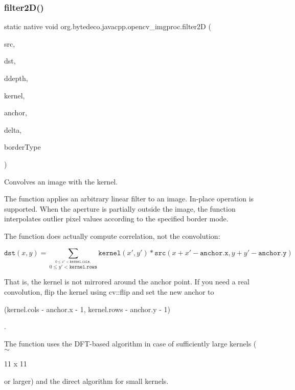 \subsubsection{\texorpdfstring{filter2\+D()}{filter2D()}}
{\footnotesize\ttfamily static native void org.\+bytedeco.\+javacpp.\+opencv\+\_\+imgproc.\+filter2D (\begin{DoxyParamCaption}\item[{@By\+Val Mat}]{src,  }\item[{@By\+Val Mat}]{dst,  }\item[{int}]{ddepth,  }\item[{@By\+Val Mat}]{kernel,  }\item[{@By\+Val(null\+Value=\char`\"{}cv\+::\+fr.antproject.utils.Point(-\/1,-\/1)\char`\"{}) fr.antproject.utils.Point}]{anchor,  }\item[{double}]{delta,  }\item[{int}]{border\+Type }\end{DoxyParamCaption})\hspace{0.3cm}{\ttfamily [static]}}



Convolves an image with the kernel. 

The function applies an arbitrary linear filter to an image. In-\/place operation is supported. When the aperture is partially outside the image, the function interpolates outlier pixel values according to the specified border mode. 

The function does actually compute correlation, not the convolution\+: 

\[\texttt{dst} (x,y) = \sum _{ \stackrel{0\leq x' < \texttt{kernel.cols},}{0\leq y' < \texttt{kernel.rows}} } \texttt{kernel} (x',y')* \texttt{src} (x+x'- \texttt{anchor.x} ,y+y'- \texttt{anchor.y} )\] 

That is, the kernel is not mirrored around the anchor point. If you need a real convolution, flip the kernel using cv\+::flip and set the new anchor to
\begin{DoxyCode}
 (kernel.cols - anchor.x - 1, kernel.rows -
anchor.y - 1) 
\end{DoxyCode}
 . 

The function uses the D\+F\+T-\/based algorithm in case of sufficiently large kernels ($\sim$
\begin{DoxyCode}
11 x 11 
\end{DoxyCode}
 or larger) and the direct algorithm for small kernels. 


